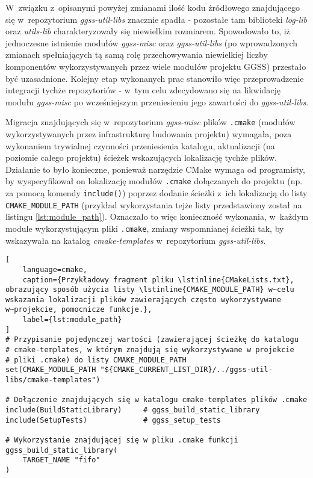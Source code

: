 W~związku z~opisanymi powyżej zmianami ilość kodu źródłowego znajdującego się w~repozytorium \emph{ggss-util-libs} znacznie spadła - pozostałe tam biblioteki \emph{log-lib} oraz \emph{utils-lib} charakteryzowały się niewielkim rozmiarem. Spowodowało to, iż jednoczesne istnienie modułów \emph{ggss-misc} oraz \emph{ggss-util-libs} (po wprowadzonych zmianach spełniających tą samą rolę przechowywania niewielkiej liczby komponentów wykorzystywanych przez wiele modułów projektu GGSS) przestało być uzasadnione. Kolejny etap wykonanych prac stanowiło więc przeprowadzenie integracji tychże repozytoriów - w~tym celu zdecydowano się na likwidację modułu \emph{ggss-misc} po wcześniejszym przeniesieniu jego zawartości do \emph{ggss-util-libs}.

Migracja znajdujących się w~repozytorium \emph{ggss-misc} plików \lstinline{.cmake} (modułów wykorzystywanych przez infrastrukturę budowania projektu) wymagała, poza wykonaniem trywialnej czynności przeniesienia katalogu, aktualizacji (na poziomie całego projektu) ścieżek wskazujących lokalizację tychże plików. Działanie to było konieczne, ponieważ narzędzie CMake wymaga od programisty, by wyspecyfikował on lokalizację modułów \lstinline{.cmake} dołączanych do projektu (np. za pomocą komendy \lstinline{include()}) poprzez dodanie ścieżki z~ich lokalizacją do listy \lstinline{CMAKE_MODULE_PATH} (przykład wykorzystania tejże listy przedstawiony został na listingu \ref{lst:module_path}). Oznaczało to więc konieczność wykonania, w~każdym module wykorzystującym pliki \lstinline{.cmake}, zmiany wspomnianej ścieżki tak, by wskazywała na katalog \emph{cmake-templates} w~repozytorium \emph{ggss-util-libs}.

\begin{lstlisting}[
    language=cmake,
    caption={Przykładowy fragment pliku \lstinline{CMakeLists.txt}, obrazujący sposób użycia listy \lstinline{CMAKE_MODULE_PATH} w~celu wskazania lokalizacji plików zawierających często wykorzystywane w~projekcie, pomocnicze funkcje.},
    label={lst:module_path}
]
# Przypisanie pojedynczej wartości (zawierającej ścieżkę do katalogu
# cmake-templates, w którym znajdują się wykorzystywane w projekcie
# pliki .cmake) do listy CMAKE_MODULE_PATH
set(CMAKE_MODULE_PATH "${CMAKE_CURRENT_LIST_DIR}/../ggss-util-libs/cmake-templates")

# Dołączenie znajdujących się w katalogu cmake-templates plików .cmake
include(BuildStaticLibrary)     # ggss_build_static_library
include(SetupTests)             # ggss_setup_tests

# Wykorzystanie znajdującej się w pliku .cmake funkcji
ggss_build_static_library(
    TARGET_NAME "fifo"
)
\end{lstlisting}


